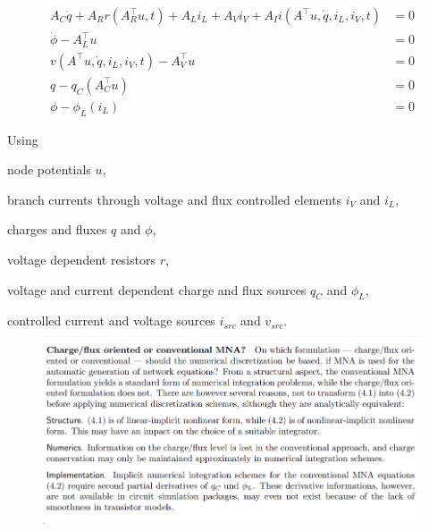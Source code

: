 \begin{align}
	A_C\dot{q} + A_R r(A_R^\top u,t) + A_L i_L + A_V i_V + A_I i(A^\top u, \dot{q}, i_L, i_V, t) &= 0 \label{charge/flux-1} \\
	\dot{\phi} - A_L^\top u &= 0 \label{charge/flux-2} \\
	v(A^\top u, \dot{q}, i_L, i_V, t) - A_V^\top u &= 0 \label{charge/flux-3} \\
	q - q_C(A_C^\top u) &= 0 \label{charge/flux-4} \\
	\phi - \phi_L(i_L) &= 0  \label{charge/flux-5} 
\end{align}

Using
\begin{description}
	\item node potentials $u$,
	\item branch currents through voltage and flux controlled elements $i_V$ and $i_L$,
	\item charges and fluxes $q$ and $\phi$,
	\item voltage dependent resistors $r$,
	\item voltage and current dependent charge and flux sources $q_C$ and $\phi_L$,
	\item controlled current and voltage sources $i_{src}$ and $v_{src}$.
\end{description} 

\begin{figure}[H]
	\centering
	\includegraphics[width=0.7\linewidth]{screenshot007}
	\caption{}
	\label{fig:screenshot007}
\end{figure}